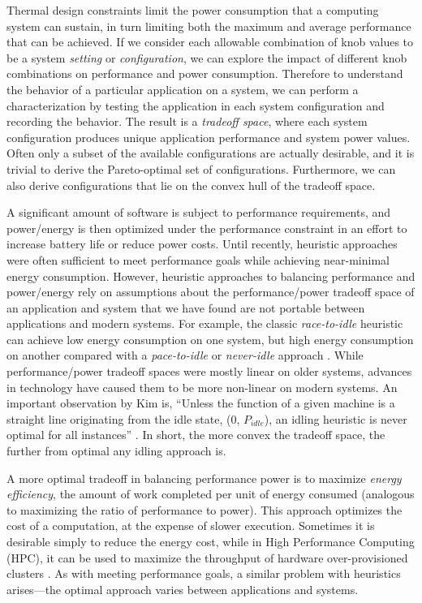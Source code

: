 Thermal design constraints limit the power consumption that a computing system can sustain, in turn limiting both the maximum and average performance that can be achieved.
If we consider each allowable combination of knob values to be a system \emph{setting} or \emph{configuration}, we can explore the impact of different knob combinations on performance and power consumption.
Therefore to understand the behavior of a particular application on a system, we can perform a characterization by testing the application in each system configuration and recording the behavior.
The result is a \emph{tradeoff space}, where each system configuration produces unique application performance and system power values.
Often only a subset of the available configurations are actually desirable, and it is trivial to derive the Pareto-optimal set of configurations.
Furthermore, we can also derive configurations that lie on the convex hull of the tradeoff space.

A significant amount of software is subject to performance requirements, and power/energy is then optimized under the performance constraint in an effort to increase battery life or reduce power costs.
Until recently, heuristic approaches were often sufficient to meet performance goals while achieving near-minimal energy consumption.
However, heuristic approaches to balancing performance and power/energy rely on assumptions about the performance/power tradeoff space of an application and system that we have found are not portable between applications and modern systems.
For example, the classic \emph{race-to-idle} heuristic can achieve low energy consumption on one system, but high energy consumption on another compared with a \emph{pace-to-idle} or \emph{never-idle} approach \cite{Imes2014}.
While performance/power tradeoff spaces were mostly linear on older systems, advances in technology have caused them to be more non-linear on modern systems.
An important observation by Kim \etal is, ``Unless the function of a given machine is a straight line originating from the idle state, (0, $P_{idle}$), an idling heuristic is never optimal for all instances'' \cite{kim-cpsna2015}.
In short, the more convex the tradeoff space, the further from optimal any idling approach is.

A more optimal tradeoff in balancing performance power is to maximize \emph{energy efficiency}, \ie the amount of work completed per unit of energy consumed (analogous to maximizing the ratio of performance to power).
This approach optimizes the cost of a computation, at the expense of slower execution.
Sometimes it is desirable simply to reduce the energy cost, while in High Performance Computing (HPC), it can be used to maximize the throughput of hardware over-provisioned clusters \cite{PatkiRMAP}.
As with meeting performance goals, a similar problem with heuristics arises---the optimal approach varies between applications and systems.


